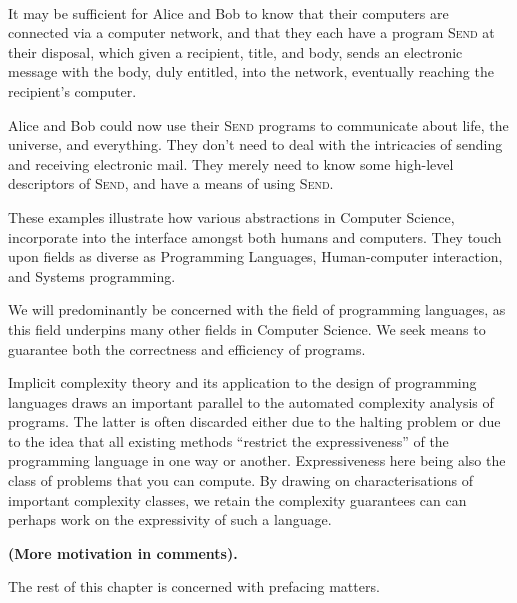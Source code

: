 \begin{example} \label{example:alice-bob-email} \

It may be sufficient for Alice and Bob to know that their computers are
connected via a computer network, and that they each have a program
\textsc{Send} at their disposal, which given a recipient, title, and body,
sends an electronic message with the body, duly entitled, into the network,
eventually reaching the recipient's computer.

Alice and Bob could now use their \textsc{Send} programs to communicate about
life, the universe, and everything. They don't need to deal with the
intricacies of sending and receiving electronic mail. They merely need to know
some high-level descriptors of \textsc{Send}, and have a means of using
\textsc{Send}.

\end{example}

These examples illustrate how various abstractions in Computer Science,
incorporate into the interface amongst both humans and computers. They touch
upon fields as diverse as Programming Languages, Human-computer interaction,
and Systems programming.

We will predominantly be concerned with the field of programming languages, as
this field underpins many other fields in Computer Science. We seek means to
guarantee both the correctness and efficiency of programs.

Implicit complexity theory and its application to the design of programming
languages draws an important parallel to the automated complexity analysis of
programs. The latter is often discarded either due to the halting problem or
due to the idea that all existing methods ``restrict the expressiveness'' of
the programming language in one way or another. Expressiveness here being also
the class of problems that you can compute. By drawing on characterisations of
important complexity classes, we retain the complexity guarantees can can
perhaps work on the expressivity of such a language.

{\bfseries\color{red}(More motivation in comments).}




The rest of this chapter is concerned with prefacing matters.

